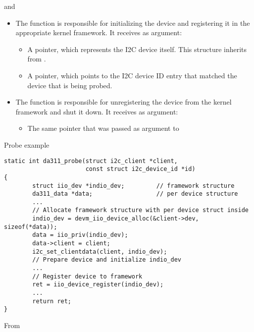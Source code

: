 \begin{frame}{ and }

  \begin{itemize}
  \item The  function is responsible for initializing
    the device and registering it in the appropriate kernel
    framework. It receives as argument:
    \begin{itemize}
    \item A  pointer, which represents the I2C
      device itself. This structure inherits from .
    \item A  pointer, which points to the
      I2C device ID entry that matched the device that is being
      probed.
    \end{itemize}
  \item The  function is responsible for
    unregistering the device from the kernel framework and shut it
    down. It receives as argument:
    \begin{itemize}
    \item The same  pointer that was passed as
      argument to 
    \end{itemize}
  \end{itemize}
\end{frame}

\begin{frame}[fragile]{Probe example}
  \begin{block}{}
    \begin{verbatim}
static int da311_probe(struct i2c_client *client,
                       const struct i2c_device_id *id)
{
        struct iio_dev *indio_dev;         // framework structure
        da311_data *data;                  // per device structure
        ...
        // Allocate framework structure with per device struct inside
        indio_dev = devm_iio_device_alloc(&client->dev, sizeof(*data));
        data = iio_priv(indio_dev);
        data->client = client;
        i2c_set_clientdata(client, indio_dev);
        // Prepare device and initialize indio_dev
        ...
        // Register device to framework
        ret = iio_device_register(indio_dev);
        ...
        return ret;
}
    \end{verbatim}
  \end{block}
  From 
\end{frame}

